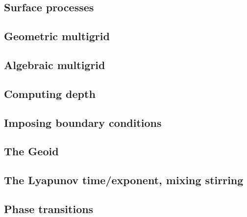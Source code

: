 \documentclass[a4paper]{article}
\begin{document}
\subsection{Surface processes \label{sec:surfaceprocesses}}  %
\newpage %
\subsection{Geometric multigrid}  %
\newpage %
\subsection{Algebraic multigrid}  %
\newpage %
\subsection{Computing depth \label{ss:depth}}  %
\newpage %
\subsection{Imposing boundary conditions \label{ss:howtobc}}  %
\newpage %
\subsection{The Geoid} \label{ss:geoid}  %
\newpage %
\subsection{The Lyapunov time/exponent, mixing stirring}\label{ss:lyapunov} %
\newpage %
\subsection{Phase transitions}\label{ss:phasetransitions} %
\newpage %
\end{document}
